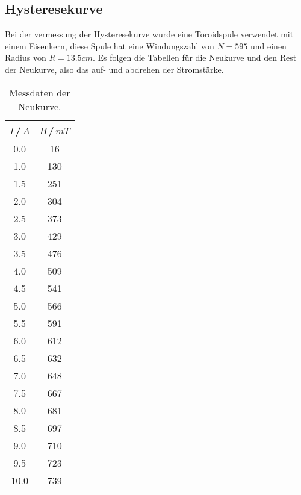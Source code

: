 \subsection{Hysteresekurve}
    Bei der vermessung der Hysteresekurve wurde eine Toroidspule verwendet mit einem Eisenkern, diese Spule hat eine Windungszahl von $N=595$ und einen Radius von $R=13.5\unit{cm}$.
    Es folgen die Tabellen für die Neukurve und den Rest der Neukurve, also das auf- und abdrehen der Stromstärke.
    \begin{table}[H]
        \centering
        \begin{tabular}{c c}
            \toprule
            $I$\,/\,$\unit{A}$ & $B$\,/\,$\unit{mT}$\\
            \midrule
            0.0  &  16  \\   
            1.0  &  130  \\   
            1.5  &  251  \\   
            2.0  &  304  \\   
            2.5  &  373  \\   
            3.0  &  429  \\   
            3.5  &  476  \\   
            4.0  &  509  \\   
            4.5  &  541  \\   
            5.0  &  566  \\   
            5.5  &  591  \\   
            6.0  &  612  \\   
            6.5  &  632  \\   
            7.0  &  648  \\   
            7.5  &  667  \\   
            8.0  &  681  \\   
            8.5  &  697  \\   
            9.0  &  710  \\   
            9.5  &  723  \\   
            10.0 &  739  \\
            \bottomrule
        \end{tabular}
        \caption{Messdaten der Neukurve.}
        \label{tab:Neukurve}
    \end{table}

